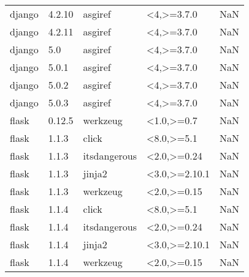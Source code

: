 \begin{tabular}{llllr}
django & 4.2.10 & asgiref & <4,>=3.7.0 & NaN \\
django & 4.2.11 & asgiref & <4,>=3.7.0 & NaN \\
django & 5.0 & asgiref & <4,>=3.7.0 & NaN \\
django & 5.0.1 & asgiref & <4,>=3.7.0 & NaN \\
django & 5.0.2 & asgiref & <4,>=3.7.0 & NaN \\
django & 5.0.3 & asgiref & <4,>=3.7.0 & NaN \\
flask & 0.12.5 & werkzeug & <1.0,>=0.7 & NaN \\
flask & 1.1.3 & click & <8.0,>=5.1 & NaN \\
flask & 1.1.3 & itsdangerous & <2.0,>=0.24 & NaN \\
flask & 1.1.3 & jinja2 & <3.0,>=2.10.1 & NaN \\
flask & 1.1.3 & werkzeug & <2.0,>=0.15 & NaN \\
flask & 1.1.4 & click & <8.0,>=5.1 & NaN \\
flask & 1.1.4 & itsdangerous & <2.0,>=0.24 & NaN \\
flask & 1.1.4 & jinja2 & <3.0,>=2.10.1 & NaN \\
flask & 1.1.4 & werkzeug & <2.0,>=0.15 & NaN \\
\bottomrule
\end{tabular}
